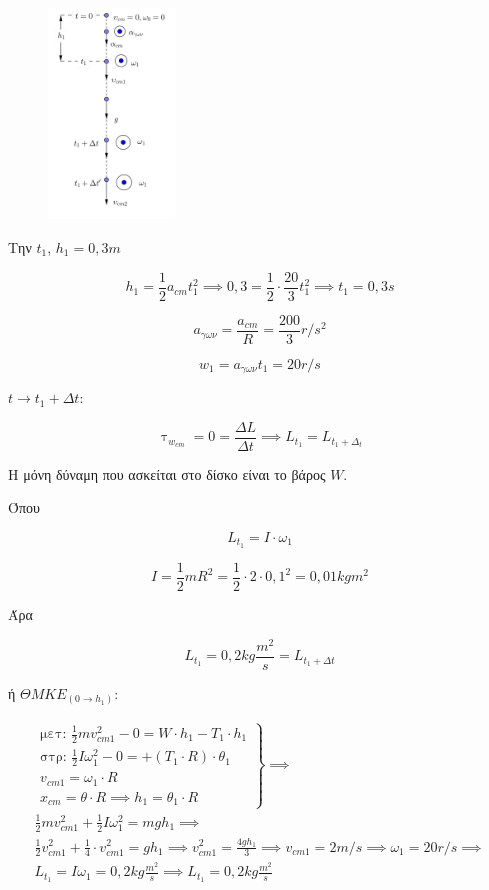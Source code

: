 \documentclass[12pt]{article}
\begin{document}
\begin{enumerate}
    \begin{figure}[h]
      \includegraphics[width=0.3\textwidth]{ΦυσικήΔ3.png}
      \centering
    \end{figure}

    Την $t_1$, $h_1=0,3m$

    $$h_1=\frac{1}{2}a_{cm}t_1^2\implies 0,3=\frac{1}{2}\cdot\frac{20}{3}t_1^2\implies t_1=0,3s$$

    $$a_{γων}=\frac{a_{cm}}{R}=\frac{200}{3}r/s^2$$

    $$w_1=a_{γων}t_1=20r/s$$

    $t \to t_1+Δt$:

    $$\uptau_{w_{cm}}=0=\frac{ΔL}{Δt}\implies L_{t_1}=L_{t_1+Δ_t}$$

    Η μόνη δύναμη που ασκείται στο δίσκο είναι το βάρος $W$.

    Όπου

    $$L_{t_1}=I\cdot ω_1$$

    $$I=\frac{1}{2}mR^2=\frac{1}{2}\cdot 2 \cdot 0,1^2=0,01kg m^2$$

    Άρα

    $$L_{t_1}=0,2kg\frac{m^2}{s}=L_{t_1+Δt}$$

    ή $ΘΜΚΕ_{(0\to h_1)}:$

    \begin{gather*}
      \left. \begin{matrix}\text{μετ: }\frac{1}{2}mv_{cm1}^2-0=W\cdot h_1-T_1\cdot h_1 \\ \text{στρ: } \frac{1}{2}Iω_1^2-0=+(T_1\cdot R)\cdot θ_1 \\ v_{cm1}=ω_1\cdot R \\ x_{cm}=θ\cdot R\implies h_1=θ_1\cdot R \end{matrix} \right\}\implies \\      \frac{1}{2}mv_{cm1}^2+\frac{1}{2}Iω_1^2=mgh_1\implies  \\
      \frac{1}{2}v_{cm1}^2+\frac{1}{4}\cdot v_{cm1}^2=gh_1 \implies v_{cm1}^2=\frac{4gh_1}{3}\implies v_{cm1}=2m/s \implies ω_1=20r/s \implies \\
       L_{t_1}=Iω_1=0,2kg \frac{m^2}{s}\implies L_{t_1}=0,2 kg \frac{m^2}{s}
    \end{gather*}


\end{enumerate}
\end{document}
